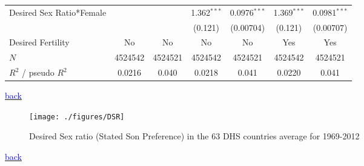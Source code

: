 \documentclass[10pt,letterpaper,subeqn]{beamer}
\begin{document}
\begin{frame}[label=DSRIMR]
\begin{table}[h!]
{\begin{tabular}{l*{6}{c}}
Desired Sex Ratio*Female&                     &                     &       1.362$^{***}$&      0.0976$^{***}$&       1.369$^{***}$&      0.0981$^{***}$\\
            &                     &                     &     (0.121)         &   (0.00704)         &     (0.121)         &   (0.00707)         \\


\hline
Desired Fertility&     No         &         No         &     No         &     No         &     Yes         &         Yes         \\
\hline
\(N\)       &     4524542         &     4524521         &     4524542         &     4524521         &     4524542         &     4524521         \\
$R^{2}$  / pseudo $R^{2}$& 0.0216  &       0.040         & 0.0218             &       0.041         &     0.0220          &       0.041         \\
\bottomrule
\end{tabular}}
\end{table}
{\footnotesize \hyperlink{DSR}{\textcolor{blue}{back}}}
\end{frame}


\begin{frame}[plain,label=DSRMap]
\begin{figure}[h!]
\centering
\texttt{[image: ./figures/DSR]}
\caption{Desired Sex ratio (Stated Son Preference) in the 63 DHS countries average for 1969-2012}
\end{figure}
{\footnotesize \hyperlink{DSR}{\textcolor{blue}{back}}}
\end{frame}
\end{document}
